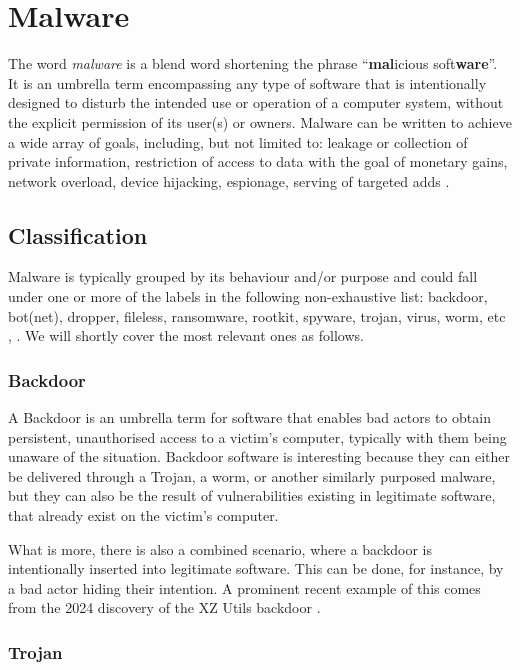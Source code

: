 \section{Malware}

The word \emph{malware} is a blend word shortening the phrase ``\textbf{mal}icious soft\textbf{ware}''. It is an umbrella term encompassing any type of software that is intentionally designed to disturb the intended use or operation of a computer system, without the explicit permission of its user(s) or owners. Malware can be written to achieve a wide array of goals, including, but not limited to: leakage or collection of private information, restriction of access to data with the goal of monetary gains, network overload, device hijacking, espionage, serving of targeted adds \cite{wiki_malware}.

\subsection{Classification}

Malware is typically grouped by its behaviour and/or purpose and could fall under one or more of the labels in the following non-exhaustive list: backdoor, bot(net), dropper, fileless, ransomware, rootkit, spyware, trojan, virus, worm, etc \cite{wiki_malware}, \cite{zeusvm}. We will shortly cover the most relevant ones as follows.

\subsubsection{Backdoor}

A Backdoor is an umbrella term for software that enables bad actors to obtain persistent, unauthorised access to a victim's computer, typically with them being unaware of the situation. Backdoor software is  interesting because they can either be delivered through a Trojan, a worm, or another similarly purposed malware, but they can also be the result of vulnerabilities existing in legitimate software, that already exist on the victim's computer. 

What is more, there is also a combined scenario, where a backdoor is intentionally inserted into legitimate software. This can be done, for instance, by a bad actor hiding their intention. A prominent recent example of this comes from the 2024 discovery of the XZ Utils backdoor \cite{xz_backdoor}.

\subsubsection{Trojan}

